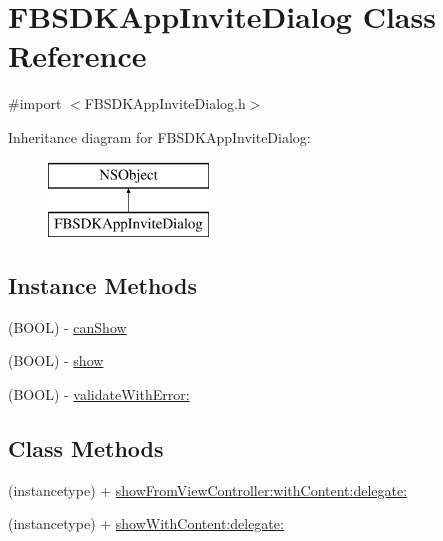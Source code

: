 \hypertarget{interface_f_b_s_d_k_app_invite_dialog}{}\section{F\+B\+S\+D\+K\+App\+Invite\+Dialog Class Reference}
\label{interface_f_b_s_d_k_app_invite_dialog}


{\ttfamily \#import $<$F\+B\+S\+D\+K\+App\+Invite\+Dialog.\+h$>$}

Inheritance diagram for F\+B\+S\+D\+K\+App\+Invite\+Dialog\+:\begin{figure}[H]
\begin{center}
\leavevmode
\includegraphics[height=2.000000cm]{interface_f_b_s_d_k_app_invite_dialog}
\end{center}
\end{figure}
\subsection*{Instance Methods}
\begin{DoxyCompactItemize}
\item 
(B\+O\+O\+L) -\/ \hyperlink{interface_f_b_s_d_k_app_invite_dialog_a77e76bfb138db2103dc112800a89eeb3}{can\+Show}
\item 
(B\+O\+O\+L) -\/ \hyperlink{interface_f_b_s_d_k_app_invite_dialog_a0b425a2d9004ee600a2dcb80ef3fbb77}{show}
\item 
(B\+O\+O\+L) -\/ \hyperlink{interface_f_b_s_d_k_app_invite_dialog_a2e1f0fa58adabb4c7f2e813aaa64c794}{validate\+With\+Error\+:}
\end{DoxyCompactItemize}
\subsection*{Class Methods}
\begin{DoxyCompactItemize}
\item 
(instancetype) + \hyperlink{interface_f_b_s_d_k_app_invite_dialog_a67ab5e4822cf101150630e2be6ca4bed}{show\+From\+View\+Controller\+:with\+Content\+:delegate\+:}
\item 
(instancetype) + \hyperlink{interface_f_b_s_d_k_app_invite_dialog_a49e82cc53fb40be0ac3995a206542c64}{show\+With\+Content\+:delegate\+:}
\end{DoxyCompactItemize}
